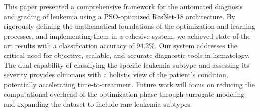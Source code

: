 \documentclass[11pt, a4paper]{article}
\begin{document}
This paper presented a comprehensive framework for the automated diagnosis and grading of leukemia using a PSO-optimized ResNet-18 architecture. By rigorously defining the mathematical foundations of the optimization and learning processes, and implementing them in a cohesive system, we achieved state-of-the-art results with a classification accuracy of 94.2\%. Our system addresses the critical need for objective, scalable, and accurate diagnostic tools in hematology. The dual capability of classifying the specific leukemia subtype and assessing its severity provides clinicians with a holistic view of the patient's condition, potentially accelerating time-to-treatment. Future work will focus on reducing the computational overhead of the optimization phase through surrogate modeling and expanding the dataset to include rare leukemia subtypes.
\end{document}
